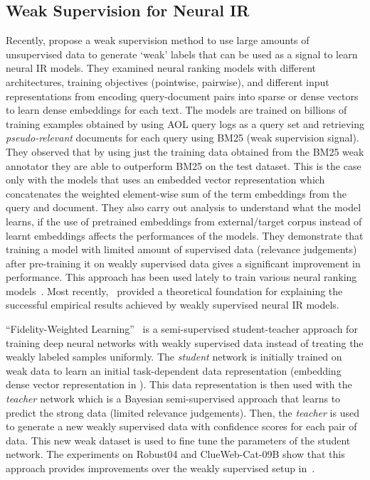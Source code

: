 \subsection{Weak Supervision for Neural IR}
\label{sec:weak_supervision_ir}
Recently, \cite{Dehghani_sigir17} propose a \textsf{weak supervision} method to use large amounts of unsupervised data to generate `weak' labels that can be used as a signal to learn neural IR models. They examined neural ranking models with different architectures, training objectives (pointwise, pairwise), and different input representations from encoding query-document pairs into sparse or dense vectors to learn dense embeddings for each text. The models are trained on billions of training examples obtained by using AOL query logs as a query set and retrieving \textit{pseudo-relevant} documents for each query using BM25 (weak supervision signal). They observed that by using just the training data obtained from the BM25 weak annotator they are able to outperform BM25 on the test dataset. This is the case only with the models that uses an embedded vector representation which concatenates the weighted element-wise sum of the term embeddings from the query and document. They also carry out analysis to understand what the model learns, if the use of pretrained embeddings from external/target corpus instead of learnt embeddings affects the performances of the models. They demonstrate that training a model with limited amount of supervised data (relevance judgements) after pre-training it on weakly supervised data gives a significant improvement in performance. This approach has been used lately to train various neural ranking models~\citep{Nie_ictir18, Nie_sigir_2018, Bo_coling18, Zamani_neural_reranking_2018}. Most recently,~\cite{Zamani_weak_sup_theory_2018} provided a theoretical foundation for explaining the successful empirical results achieved by weakly supervised neural IR models. 

``\textsf{Fidelity-Weighted Learning}''~\citep{dehghani_nips17, dehghani2018fidelityweighted} is a semi-supervised student-teacher approach for training deep neural networks with weakly supervised data instead of treating the weakly labeled samples uniformly. The \textit{student} network is initially trained on weak data to learn an initial task-dependent data representation (embedding dense vector representation in \cite{Dehghani_sigir17}). This data representation is then used with the \textit{teacher} network which is a Bayesian semi-supervised approach that learns to predict the strong data (limited relevance judgements). Then, the \textit{teacher} is used to generate a new weakly supervised data with confidence scores for each pair of data. This new weak dataset is used to fine tune the parameters of the student network. The experiments on Robust04 and ClueWeb-Cat-09B show that this approach provides improvements over the weakly supervised setup in~\cite{Dehghani_sigir17}. %

